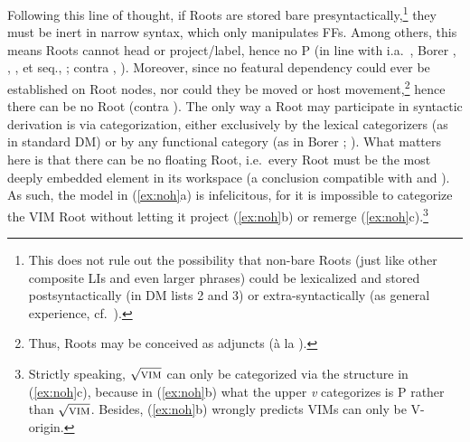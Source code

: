 \documentclass[output=paper]{langsci/langscibook}
\begin{document}
Following this line of thought, if Roots are stored bare
presyntactically,\footnote{This does not rule out the possibility that non-bare
Roots (just like other composite LIs and even larger phrases) could be
lexicalized and stored postsyntactically (in \gls{DM} lists 2 and 3) or
extra-syntactically (as general experience, cf.\ \citealt{Marantz2013}).} they
must be inert in narrow syntax, which only manipulates FFs. Among others, this
means Roots cannot head or project/label, hence no {\textsurd}P (in line with
i.a.\ \citealt{Acquaviva2009}, Borer \citeyear{Borer2009}, \citeyear{Borer2014},
\citealt{Chomsky2013}, \citealt{deBelder2011} et seq., \citealt{Alexiadou2014};
contra \citealt{Cuervo2014}, \citealt{Harley2014}). Moreover, since no featural
dependency could ever be established on Root nodes, nor could they be moved or
host movement,\footnote{Thus, Roots may be conceived as adjuncts (\`{a} la
\citealt{Marantz2013}).} hence there can be no Root  (contra
\citealt{Harley2009}). The only way a Root may participate in syntactic
derivation is via categorization, either exclusively by the lexical
categorizers (as in standard \gls{DM}) or by any functional category (as in
Borer \citeyear{Borer2005,Borer2013}; \citealt{Biberauer2016,Song2017roots}).
What matters here is that there can be no floating Root, i.e.\ every Root must be
the most deeply embedded element in its workspace (a conclusion compatible with
\citealt{Marantz2001b} and \citealt{Boeckx2014}). As such, the model in
(\ref{ex:noh}a) is infelicitous, for it is impossible to categorize the
\gls{VIM} Root without letting it project
(\ref{ex:noh}b) or remerge (\ref{ex:noh}c).\footnote{Strictly speaking,
    $\sqrt{\textrm{\textsc{vim}}}$ can only be categorized via the
     structure in (\ref{ex:noh}c), because in (\ref{ex:noh}b)
    what the upper {\em v} categorizes is {\textsurd}P rather than
    $\sqrt{\textrm{\textsc{vim}}}$.  Besides, (\ref{ex:noh}b) wrongly predicts
\glspl{VIM} can only be V-origin.}
\end{document}
